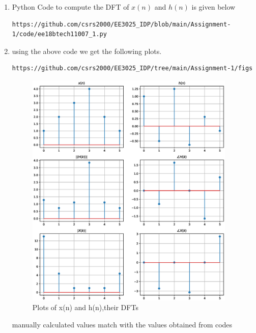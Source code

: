 \documentclass[journal,12pt,twocolumn]{IEEEtran}
\renewcommand\thesection{\arabic{section}}
\begin{document}
\begin{enumerate}[label=\thesection.\arabic*.,ref=\thesection.\theenumi]
\\
\\
\item Python Code to compute the DFT of $x(n)$ and $h(n)$ is given below
\begin{lstlisting}
https://github.com/csrs2000/EE3025_IDP/blob/main/Assignment-1/code/ee18btech11007_1.py
\end{lstlisting}
\item using the above code we get the following plots.
\begin{lstlisting}
https://github.com/csrs2000/EE3025_IDP/tree/main/Assignment-1/figs
\end{lstlisting}
\begin{figure}[h!]
    \centering
    \includegraphics[width=10cm]{./figs/ee18btech11007.eps}
    \caption{Plots of x(n) and h(n),their DFTs}
    \label{figs}
\end{figure}
manually calculated values match with the values obtained from codes
\end{enumerate}
\end{document}
